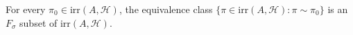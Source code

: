 For every $\pi_0 \in \text{irr}(A, \mathcal{H})$, the equivalence class $\{\pi \in \text{irr}(A, \mathcal{H}) : \pi \sim \pi_0\}$ is an $F_\sigma$ subset of $\text{irr}(A, \mathcal{H})$.

